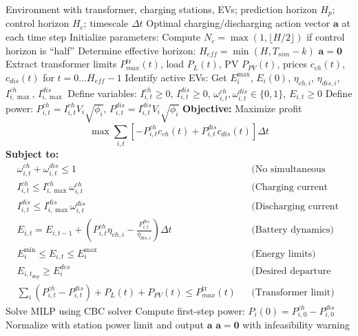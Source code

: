 \begin{algorithm}[H]
\caption{Online MPC Solver for EV Charging and Discharging Control}
\label{alg:online_mpc}
{\small
\begin{algorithmic}[1]
\Require Environment with transformer, charging stations, EVs; prediction horizon $H_p$; control horizon $H_c$; timescale $\Delta t$
\Ensure Optimal charging/discharging action vector $\mathbf{a}$ at each time step
\State Initialize parameters:
      \State Compute $N_c = \max(1, \lfloor H / 2 \rfloor)$ if control horizon is ``half''
    \State Determine effective horizon: $H_{eff} = \min(H, T_{sim} - k)$
        \State \Return $\mathbf{a} = \mathbf{0}$
    \EndIf
    \State Extract transformer limits $P^{\text{tr}}_{max}(t)$, load $P_L(t)$, PV $P_{PV}(t)$, prices $c_{ch}(t)$, $c_{dis}(t)$ for $t = 0 \dots H_{eff}-1$
    \State Identify active EVs:
        \State Get $E_i^{\max}$, $E_i(0)$, $\eta_{ch,i}$, $\eta_{dis,i}$, $I^{ch}_{i,\max}$, $I^{dis}_{i,\max}$
    \EndFor
    \State Define variables: $I^{ch}_{i,t} \ge 0$, $I^{dis}_{i,t} \ge 0$, $\omega^{ch}_{i,t}, \omega^{dis}_{i,t} \in \{0,1\}$, $E_{i,t} \ge 0$
    \State Define power: $P^{ch}_{i,t} = I^{ch}_{i,t} V_i \sqrt{\phi_i}$, $P^{dis}_{i,t} = I^{dis}_{i,t} V_i \sqrt{\phi_i}$
    \State \textbf{Objective:} Maximize profit
    \[
    \max \sum_{i,t} \left[-P^{ch}_{i,t} c_{ch}(t) + P^{dis}_{i,t} c_{dis}(t)\right] \Delta t
    \]
    \State \textbf{Subject to:}
    \begin{align*}
        & \omega^{ch}_{i,t} + \omega^{dis}_{i,t} \le 1 && \text{(No simultaneous charge/discharge)} \\
        & I^{ch}_{i,t} \le I^{ch}_{i,\max} \omega^{ch}_{i,t} && \text{(Charging current limit)} \\
        & I^{dis}_{i,t} \le I^{dis}_{i,\max} \omega^{dis}_{i,t} && \text{(Discharging current limit)} \\
        & E_{i,t} = E_{i,t-1} + (P^{ch}_{i,t} \eta_{ch,i} - \tfrac{P^{dis}_{i,t}}{\eta_{dis,i}})\Delta t && \text{(Battery dynamics)} \\
        & E_i^{\min} \le E_{i,t} \le E_i^{\max} && \text{(Energy limits)} \\
        & E_{i,t_{dep}} \ge E_i^{des} && \text{(Desired departure energy)} \\
        & \sum_i (P^{ch}_{i,t} - P^{dis}_{i,t}) + P_L(t) + P_{PV}(t) \le P^{\text{tr}}_{max}(t) && \text{(Transformer limit)}
    \end{align*}
    \State Solve MILP using CBC solver
        \State Compute first-step power: $P_i(0) = P^{ch}_{i,0} - P^{dis}_{i,0}$
        \State Normalize with station power limit and output $\mathbf{a}$
    \Else
        \State \Return $\mathbf{a} = \mathbf{0}$ with infeasibility warning
    \EndIf
\EndFor
\end{algorithmic}
}
\end{algorithm}

